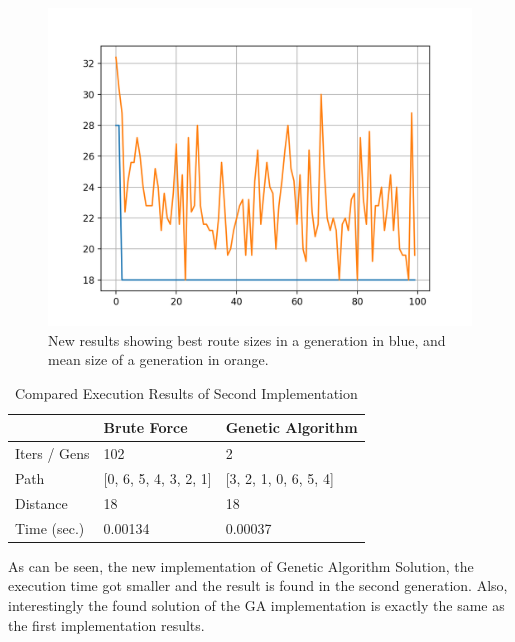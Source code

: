 \documentclass[journal,transmag]{IEEEtran}
\begin{document}
    \begin{figure}[h!]
        \includegraphics[width=\linewidth]{new-results.png}
        \caption{
            New results showing best route sizes in a generation in blue, and
            mean size of a generation in orange.
        }
        \label{fig:new-results}
    \end{figure}

    \begin{table}[h!]
        \begin{center}
            \begin{tabular}{| l | l | l |}
            \hline
            & Brute Force & Genetic Algorithm \\ \hline
            Iters / Gens & 102 & 2 \\ \hline
            Path & [0, 6, 5, 4, 3, 2, 1] & [3, 2, 1, 0, 6, 5, 4] \\ \hline
            Distance & 18 & 18 \\ \hline
            Time (sec.) & 0.00134 & 0.00037 \\
            \hline
            \end{tabular}
        \end{center}
        \caption{Compared Execution Results of Second Implementation}
    \end{table}

    As can be seen, the new implementation of Genetic Algorithm Solution, the
    execution time got smaller and the result is found in the second generation.
    Also, interestingly the found solution of the GA implementation is exactly
    the same as the first implementation results.
\end{document}
